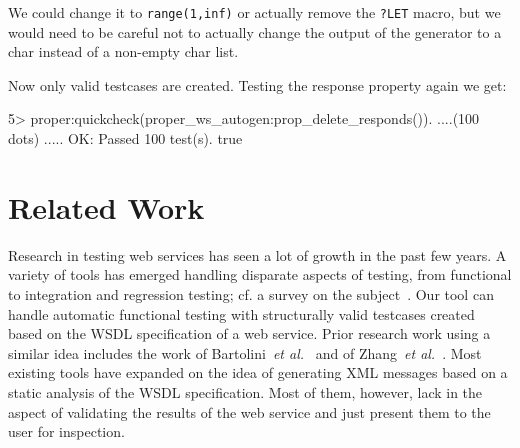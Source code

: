 \documentclass[submission,copyright]{eptcs}
\newcommand{\LET}{\texttt{?LET}\xspace}
\begin{document}
We could change it to \texttt{range(1,inf)} or actually remove the
\LET macro, but we would need to be careful not to actually change the
output of the generator to a char instead of a non-empty char list.

Now only valid testcases are created. Testing the response property again we 
get:
\begin{lstoutput}
5> proper:quickcheck(proper_ws_autogen:prop_delete_responds()).
....(100 dots) .....
OK: Passed 100 test(s).
true
\end{lstoutput}


\section{Related Work} \label{sec:related}

Research in testing web services has seen a lot of growth in the past
few years. A variety of tools has emerged handling disparate aspects
of testing, from functional to integration and regression testing; cf.
a survey on the subject~\cite{SOATesting@springerlink-09}. Our tool
can handle automatic functional testing with structurally valid
testcases created based on the WSDL specification of a web service.
Prior research work using a similar idea includes the work of
Bartolini~\textit{et al.}~\cite{bartolini@ICSOC-08} and of
Zhang~\textit{et al.}~\cite{zhang@IC-08}. Most existing tools have
expanded on the idea of generating XML messages based on a static
analysis of the WSDL specification. Most of them, however, lack in the
aspect of validating the results of the web service and just present
them to the user for inspection.
\end{document}
